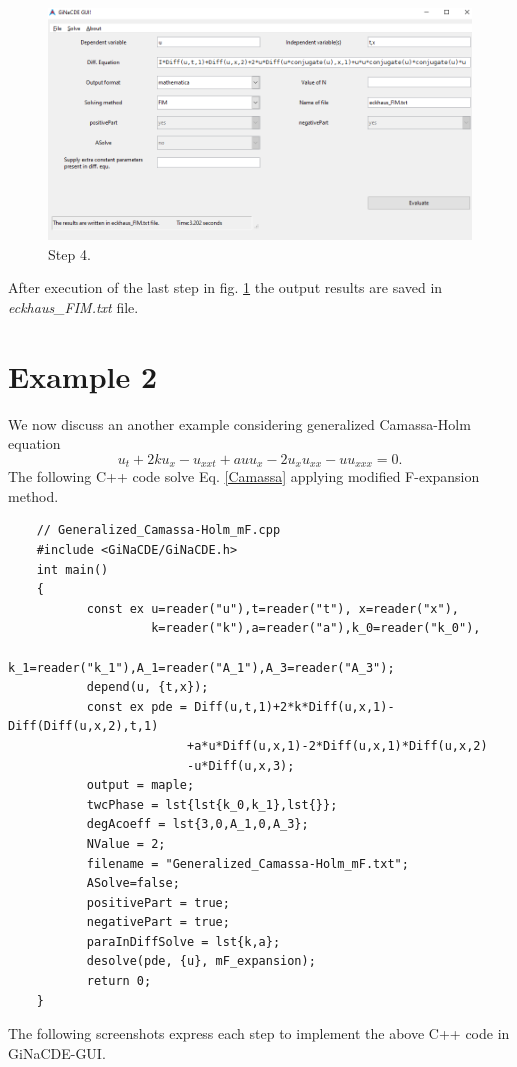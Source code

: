 \documentclass[11pt,a4paper,titlepage]{article}
\begin{document}
\begin{figure}[H]
	\centering
	\includegraphics[width=\linewidth]{Ex1step4}
	\caption{ Step 4. }
	\label{fig:Ex1step4}
\end{figure}

After execution of the last step in fig. \ref{fig:Ex1step4} the output results are saved in \emph{eckhaus\_FIM.txt} file.
\section{Example 2}
We now discuss an another example considering generalized Camassa-Holm equation
\begin{equation}\label{Camassa}
	{u_t} + 2k{u_x} - {u_{xxt}} + au{u_x} - 2{u_x}{u_{xx}} - u{u_{xxx}} = 0.
\end{equation}
The following C++ code solve Eq. \eqref{Camassa} applying modified F-expansion method.
\begin{verbatim}
	// Generalized_Camassa-Holm_mF.cpp
	#include <GiNaCDE/GiNaCDE.h>
	int main()
	{
		   const ex u=reader("u"),t=reader("t"), x=reader("x"),
		            k=reader("k"),a=reader("a"),k_0=reader("k_0"),
		            k_1=reader("k_1"),A_1=reader("A_1"),A_3=reader("A_3");   
		   depend(u, {t,x});
		   const ex pde = Diff(u,t,1)+2*k*Diff(u,x,1)-Diff(Diff(u,x,2),t,1)
		                 +a*u*Diff(u,x,1)-2*Diff(u,x,1)*Diff(u,x,2)
		                 -u*Diff(u,x,3); 
		   output = maple;
		   twcPhase = lst{lst{k_0,k_1},lst{}};
		   degAcoeff = lst{3,0,A_1,0,A_3};
		   NValue = 2;
		   filename = "Generalized_Camassa-Holm_mF.txt";
		   ASolve=false;
		   positivePart = true; 
		   negativePart = true;
		   paraInDiffSolve = lst{k,a};
		   desolve(pde, {u}, mF_expansion);
		   return 0;
	}
\end{verbatim}
The following screenshots express each step to implement the above C++ code in GiNaCDE-GUI.
\end{document}
